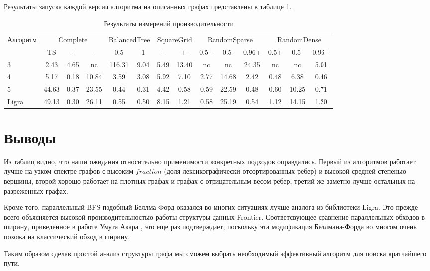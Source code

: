 \FloatBarrier
Результаты запуска каждой версии алгоритма на описанных графах представлены в таблице \ref{graph_description}.
\begin{table}[H]
\centering
\caption{Результаты измерений производительности}
\begin{tabular}{l|ccc|cc|cc|ccc|ccc}  
\hline
Алгоритм & \multicolumn{3}{c}{Complete} & \multicolumn{2}{c}{BalancedTree} & \multicolumn{2}{c}{SquareGrid} & \multicolumn{3}{c}{RandomSparse} & \multicolumn{3}{c}{RandomDense}\\
& TS & + & - & 0.5 & 1 & + & +- & 0.5+  & 0.5- & 0.96+ & 0.5+ & 0.5- & 0.96+\\
\hline\hline
3 & 2.43 & 4.65 & nc & 116.31 & 9.04 & 5.49 & 13.40 & nc & nc & 24.35 & nc & nc & 5.01 \\  
4 & 5.17 & 0.18 & 10.84 & 3.59 & 3.08 & 5.92 & 7.10 & 2.77 & 14.68 & 2.42 & 0.48  & 6.38  & 0.46 \\
5 & 44.63 & 0.37 & 23.55 & 0.44 & 0.31 & 4.42 & 0.58 & 0.59 & 22.59 & 0.48  & 0.60  & 10.25 & 0.71 \\
Ligra & 49.13 & 0.30 & 26.11 & 0.55 & 0.50 & 8.15 & 1.21 & 0.58 & 25.19 & 0.54  & 1.12  & 14.15 & 1.20 \\
\hline
\end{tabular}

\label{graph_description}
\end{table}

\FloatBarrier
\section{Выводы}

Из таблиц видно, что наши ожидания относительно применимости конкретных подходов оправдались. Первый из алгоритмов работает лучше на узком спектре графов с высоким $fraction$ (доля лексикографически отсортированных ребер) и высокой средней степенью вершины, второй хорошо работает на плотных графах и графах с отрицательным весом ребер, третий же заметно лучше остальных на разреженных графах.

Кроме того, параллельный BFS-подобный Беллма-Форд оказался во многих ситуациях лучше аналога из библиотеки Ligra. Это прежде всего объясняется высокой производительностью работы структуры данных Frontier. Соответсвующее сравнение параллельных обходов в ширину, приведенное в работе Умута Акара \cite{FRONTIERSEARCH}, это еще раз подтверждает, поскольку эта модификация Беллмана-Форда во многом очень похожа на классический обход в ширину. 

Таким образом сделав простой анализ структуры графа мы сможем выбрать необходимый эффективный алгоритм для поиска кратчайшего пути. 
\FloatBarrier
